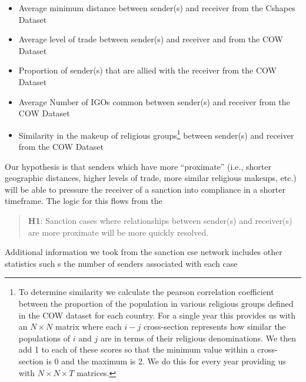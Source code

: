 \begin{itemize}
	\item Average minimum distance between sender(s) and receiver from the Cshapes Dataset \citep{weidmann2010geography}
	\item Average level of trade between sender(s) and receiver and from the COW Dataset \citep{barbieri2009trading}
	\item Proportion of sender(s) that are allied with the receiver from the COW Dataset \citep{gibler2009international}
	\item Average Number of IGOs common between sender(s) and receiver from the COW Dataset \citep{pevehouse2004correlates}
	\item Similarity in the makeup of religious groups\footnote{To determine similarity we calculate the pearson correlation coefficient between the proportion of the population in various religious groups defined in the COW dataset for each country. For a single year this provides us with an $N \times N$ matrix where each $i-j$ cross-section represents how similar the populations of $i$ and $j$ are in terms of their religious denominations. We then add 1 to each of these scores so that the minimum value within a cross-section is 0 and the maximum is 2. We do this for every year providing us with $N \times N \times T$ matrices.} between sender(s) and receiver from the COW Dataset \citep{maoz2013world}
\end{itemize}

Our hypothesis is that senders which have more ``proximate'' (i.e., shorter geographic distances, higher levels of trade, more similar religious makeups, etc.) will be able to pressure the receiver of a sanction into compliance in a shorter timeframe. The logic for this flows from the 

\begin{quote}
	\textbf{H1}: Sanction cases where relationships between sender(s) and receiver(s) are more proximate will be more quickly resolved.
\end{quote}

Additional information we took from the sanction cse network includes other statistics such s the number of senders associated with each case


